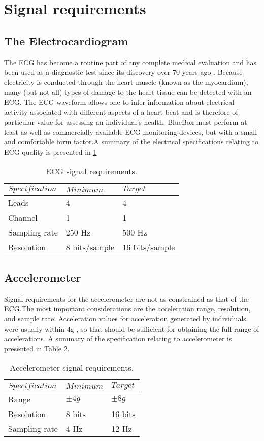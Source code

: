 \section{Signal requirements}\label{signal requirements}
\subsection{The Electrocardiogram}
\hspace{10mm}The ECG has become a routine part of any complete medical evaluation and has been used as a diagnostic 
test since its discovery over 70 years ago \cite{ecg}. Because electricity is conducted through 
the heart muscle (known as the myocardium), many (but not all) types of damage 
to the heart tissue can be detected with an ECG. The ECG waveform allows one to 
infer information about electrical activity associated with different aspects of a heart 
beat and is therefore of particular value for assessing an individual's  health. 
BlueBox must perform at least as well as commercially available ECG monitoring devices, but with a small and comfortable form factor.A summary of the electrical specifications relating to ECG quality is presented in \ref{table:ecg}

\begin{table}
  \centering
  \begin{tabular}{|l|l|l|}
    \hline
    $Specification$ & $Minimum$ & $Target$ \\
    \hline
    Leads & 4 & 4 \\
    Channel & 1 & 1 \\
    Sampling rate & 250 Hz & 500 Hz \\
    Resolution & 8 bits/sample & 16 bits/sample \\
    \hline
  \end{tabular}
  \caption{ECG signal requirements.}
  \label{table:ecg}
\end{table}

\subsection{Accelerometer}
\hspace{10mm}Signal requirements for the accelerometer are not as constrained as that of the ECG.The most important considerations are the acceleration range, resolution, and sample rate. Acceleration values for acceleration generated by individuals were usually within 4g \cite{wearable_ecg}, so that should be sufficient for obtaining the full range of accelerations. A summary of the specification relating to accelerometer is presented in Table \ref{table:acc}.
\begin{table}[h]
	\centering
	\begin{tabular}{|l |l|l|}
		\hline
		$Specification$ & $Minimum$ & $Target$ \\
		\hline
		Range & $\pm 4g$ & $\pm 8g$ \\
		Resolution & 8 bits & 16 bits\\
		Sampling rate & 4 Hz & 12 Hz \\
		\hline
	\end{tabular}
	\caption{Accelerometer signal requirements.}
	\label{table:acc}
\end{table}

